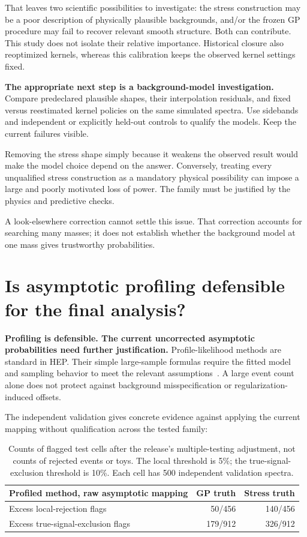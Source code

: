 \documentclass[11pt]{article}
\begin{document}
That leaves two scientific possibilities to investigate: the stress construction may be a poor description of physically plausible backgrounds, and/or the frozen GP procedure may fail to recover relevant smooth structure. Both can contribute. This study does not isolate their relative importance. Historical closure also reoptimized kernels, whereas this calibration keeps the observed kernel settings fixed.

\textbf{The appropriate next step is a background-model investigation.} Compare predeclared plausible shapes, their interpolation residuals, and fixed versus reestimated kernel policies on the same simulated spectra. Use sidebands and independent or explicitly held-out controls to qualify the models. Keep the current failures visible.

Removing the stress shape simply because it weakens the observed result would make the model choice depend on the answer. Conversely, treating every unqualified stress construction as a mandatory physical possibility can impose a large and poorly motivated loss of power. The family must be justified by the physics and predictive checks.

A look-elsewhere correction cannot settle this issue. That correction accounts for searching many masses; it does not establish whether the background model at one mass gives trustworthy probabilities.

\clearpage
\section{Is asymptotic profiling defensible for the final analysis?}
\textbf{Profiling is defensible. The current uncorrected asymptotic probabilities need further justification.} Profile-likelihood methods are standard in HEP. Their simple large-sample formulas require the fitted model and sampling behavior to meet the relevant assumptions~\cite{cowan}. A large event count alone does not protect against background misspecification or regularization-induced offsets.

The independent validation gives concrete evidence against applying the current mapping without qualification across the tested family:

\begin{table}[H]\centering\small
\begin{tabular}{lrr}\toprule
Profiled method, raw asymptotic mapping & GP truth & Stress truth\\\midrule
Excess local-rejection flags & 50/456 & 140/456\\
Excess true-signal-exclusion flags & 179/912 & 326/912\\
\bottomrule\end{tabular}
\caption{Counts of flagged test cells after the release's multiple-testing adjustment, not counts of rejected events or toys. The local threshold is 5\%; the true-signal-exclusion threshold is 10\%. Each cell has 500 independent validation spectra.}
\end{table}
\end{document}
